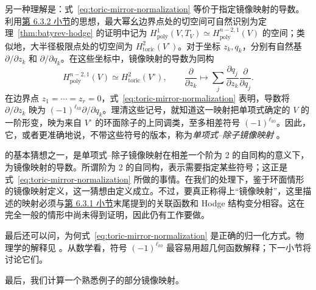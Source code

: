 另一种理解是：式~\eqref{eq:toric-mirror-normalization} 等价于指定镜像映射的导数。利用\hyperref[subsec:mirror-map-derivative]{第 6.3.2 小节}的思想，最大幂幺边界点处的切空间可自然识别为定理~\ref{thm:batyrev-hodge} 的证明中记为 $H^1_{\mathrm{poly}}(V,T_V)\simeq H^{n-2,1}_{\mathrm{poly}}(V)$ 的空间；类似地，大半径极限点处的切空间为 $H^2_{\mathrm{toric}}(V^\circ)$。对于坐标 $z_k,q_k$，分别有自然基 $\partial/\partial z_k$ 和 $\partial/\partial q_k$。在这些坐标中，镜像映射的导数为同构
\[
H^{n-2,1}_{\mathrm{poly}}(V)\simeq H^2_{\mathrm{toric}}(V^\circ),\qquad
\frac\partial{\partial z_k}\longmapsto
\sum_j\frac{\partial q_j}{\partial z_k}\frac\partial{\partial q_j}.
\]
在边界点 $z_1=\cdots=z_r=0$，式~\eqref{eq:toric-mirror-normalization} 表明，导数将 $\partial/\partial z_k$ 映为 $(-1)^{\ell_{k0}}\partial/\partial q_k$。理清这些记号，就知道这一映射把单项式确定的 $V$ 的一阶形变，映为来自 $V^\circ$ 的环面除子的上同调类，至多相差符号 $(-1)^{\ell_{k0}}$。因此，它，或者更准确地说，不带这些符号的版本，称为\emph{单项式–除子镜像映射} 。

 的基本猜想之一，是单项式–除子镜像映射在相差一个阶为 2 的自同构的意义下，为镜像映射的导数。所谓阶为 2 的自同构，表示需要指定某些符号；这正是式~\eqref{eq:toric-mirror-normalization} 所做的事情。在我们的处理下，鉴于环面情形的镜像映射定义，这一猜想由定义成立。不过，要真正称得上“镜像映射”，这里描述的映射必须与\hyperref[subsec:mirror-map-definition]{第 6.3.1 小节}末尾提到的关联函数和 Hodge 结构变分相容。这在完全一般的情形中尚未得到证明，因此仍有工作要做。

最后还可以问，为何式~\eqref{eq:toric-mirror-normalization} 是正确的归一化方式。物理学的解释见 。从数学看，符号 $(-1)^{\ell_{k0}}$ 最容易用超几何函数解释；下一小节将讨论它们。

最后，我们计算一个熟悉例子的部分镜像映射。

